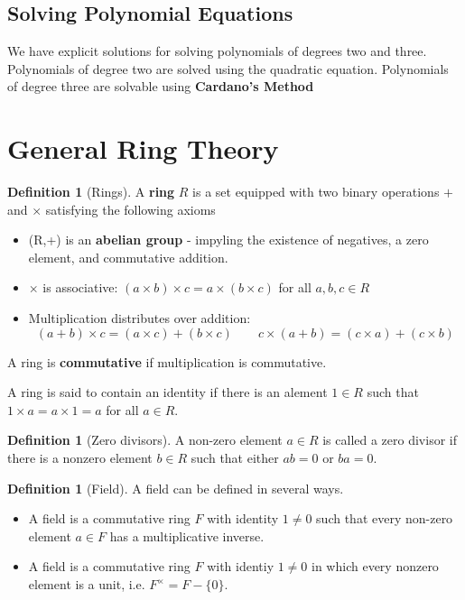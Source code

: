 \documentclass[10pt, oneside, reqno]{amsart}
\theoremstyle{plain}%
\theoremstyle{definition}
\newtheorem{defn}[thm]{Definition}
\theoremstyle{remark}
\begin{document}
\subsection{Solving Polynomial Equations} %
\label{sub:solving_polynomial_equations}
We have explicit solutions for solving polynomials of degrees two and three. Polynomials of degree two are solved using the quadratic equation.  Polynomials of degree three are solvable using \textbf{Cardano's Method}



\section{General Ring Theory} %
\label{cha:general_ring_theory}

\begin{defn}[Rings]
    A \textbf{ring} $R$ is a set equipped with two binary operations $+$ and $\times$ satisfying the following axioms
    \begin{itemize}
        \item (R,+) is an \textbf{abelian group} -  impyling the existence of negatives, a zero element, and commutative addition.
        \item $\times$ is associative: $(a \times b) \times c = a \times (b \times c)$ for all $a,b,c \in R$
        \item Multiplication distributes over addition: \[
            (a + b) \times c  = (a \times c) + (b \times c) \qquad c \times (a + b) = (c \times a) + (c \times b)
        \]
    \end{itemize}
    
    A ring is \textbf{commutative} if multiplication is commutative.  
    
    A ring is said to contain an identity if there is an alement $1 \in R$ such that $1 \times a = a \times 1 = a$ for all $a \in R$.
\end{defn}

\begin{defn}[Zero divisors]
    A non-zero element $a \in R$ is called a zero divisor if there is a nonzero element $b \in R$ such that either $ab = 0$ or $ba = 0$. 
\end{defn}

\begin{defn}[Field]
    A field can be defined in several ways.
    \begin{itemize}
        \item A field is a commutative ring $F$ with identity $1 \neq 0$ such that every non-zero element $a \in F$ has a multiplicative inverse.
        \item A field is a commutative ring $F$ with identiy $1 \neq 0$ in which every nonzero element is a unit, i.e. $F^{\times} = F - \{0\}$.
    \end{itemize}
\end{defn}
\end{document}
